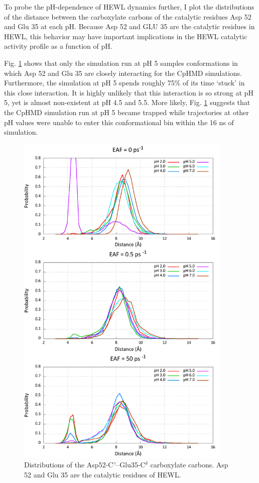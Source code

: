 To probe the pH-dependence of HEWL dynamics further, I plot the distributions
of the distance between the carboxylate carbons of the catalytic residues Asp 52
and Glu 35 at each pH.  Because Asp 52 and GLU 35 are the catalytic residues in
HEWL, this behavior may have important implications in the HEWL catalytic
activity profile as a function of pH.

Fig. \ref{fig3:cat_dist} shows that only the simulation run at pH 5 samples
conformations in which Asp 52 and Glu 35 are closely interacting for the CpHMD
simulations.  Furthermore, the simulation at pH 5 spends roughly 75\% of its
time `stuck' in this close interaction.  It is highly unlikely that this
interaction is so strong at pH 5, yet is almost non-existent at pH 4.5 and 5.5.
More likely, Fig. \ref{fig3:cat_dist} suggests that the CpHMD simulation run at
pH 5 became trapped while trajectories at other pH values were unable to enter
this conformational bin within the 16 ns of simulation.

\begin{figure}
 \includegraphics[width=4.06in, height=6.5in]{Catalytic_Distances.png}
 \caption{Distributions of the Asp52-C$^\gamma$--Glu35-C$^\delta$ carboxylate
          carbons. Asp 52 and Glu 35 are the catalytic residues of HEWL.}
 \label{fig3:cat_dist}
\end{figure}

